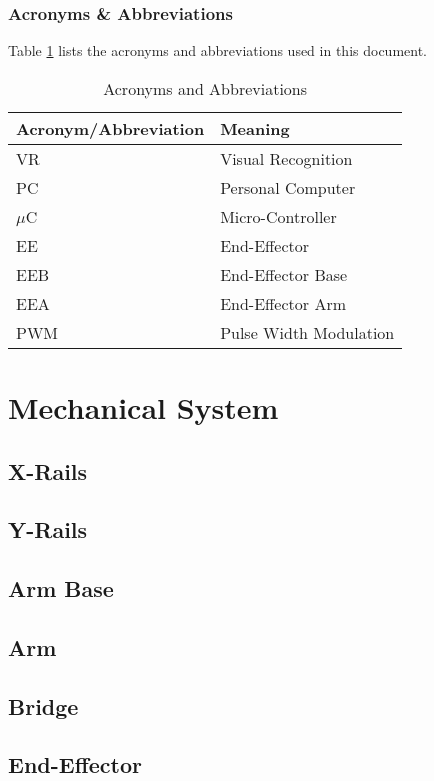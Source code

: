 \documentclass[titlepage]{article}
\begin{document}
\subsubsection{Acronyms \& Abbreviations}
Table \ref{tab:Acronyms} lists the acronyms and abbreviations used in this document.
\begin{table}[h!]
\centering
\caption{Acronyms and Abbreviations}
\begin{tabular}{| p{6cm} | p{6cm} |}\hline
	\textbf{Acronym/Abbreviation}	&\textbf{Meaning}\\\hline
	VR								&Visual Recognition\\\hline
	PC								&Personal Computer\\\hline
	$\mu$C							&Micro-Controller\\\hline
	EE								&End-Effector\\\hline
	EEB								&End-Effector Base\\\hline
	EEA								&End-Effector Arm\\\hline
	PWM								&Pulse Width Modulation\\\hline
\end{tabular}
\label{tab:Acronyms}
\end{table}



\section{Mechanical System}
\subsection{X-Rails}
\subsection{Y-Rails}
\subsection{Arm Base}
\subsection{Arm}
\subsection{Bridge}
\subsection{End-Effector}
\end{document}
